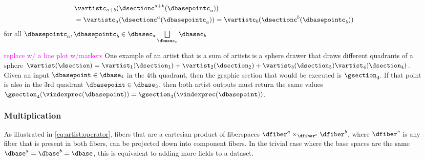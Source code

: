 \documentclass[10pt,journal,compsoc]{IEEEtran}
\newcommand{\note}[1]{\textcolor{magenta}{#1}}
\theoremstyle{definition}
\theoremstyle{remark}
\begin{document}
\begin{equation}
  \label{eq:artist:plus:verify}
  \begin{split}
  &\vartistc_{a+b}(\dsectionc^{a+b}(\dbasepointc_{a})) \\ 
  & = \vartistc_{a}(\dsectionc^{a}(\dbasepointc_{a})) = \vartistc_{b}(\dsectionc^{b}(\dbasepointc_{b}))
  \end{split}
\end{equation}
 for all $\dbasepointc_{a}, \dbasepointc_{b} \in \dbasec_{a}\bigsqcup\limits_{\dbasec_{c}} \dbasec_{b}$  
 
 \note{replace w/ a line plot w/markers}
 One example of an artist that is a sum of artists is a sphere drawer that draws different quadrants of a sphere $\vartist(\dsection) = \vartist_{1}(\dsection_{1}) + \vartist_{2}(\dsection_{2}) + \vartist_{3}(\dsection_{3}) \vartist_{4}(\dsection_{4})$. Given an input $\dbasepoint \in \dbase_4$ in the 4th quadrant, then the graphic section that would be executed is $\gsection_{4}$. If that point is also in the 3rd quadrant  $\dbasepoint \in \dbase_3$, then both artist outputs must return the same values $\gsection_{4}(\vindexprec(\dbasepoint)) = \gsection_{3}(\vindexprec(\dbasepoint))$. 


\subsubsection{Multiplication}
\label{sec:artist:operator:multiplication}
As illustrated in \autoref{eq:artist:operator},  fibers that are a cartesian product of fiberspaces $\dfiber^{a} \times_{\dfiber^c} \dfiber^{b}$, where $\dfiber^c$ is any fiber that is present in both fibers, can be projected down into component fibers. In the trivial case where the base spaces are the same $\dbase^{a} = \dbase^{b} = \dbase$, this is equivalent to adding more fields to a dataset. 
\end{document}
